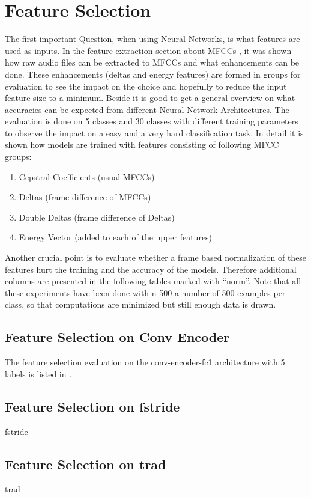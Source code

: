 
\section{Feature Selection}\label{sec:exp_fs}
The first important Question, when using Neural Networks, is what features are used as inputs.
In the feature extraction section about MFCCs , it was shown how raw audio files can be extracted to MFCCs and what enhancements can be done.
These enhancements (deltas and energy features) are formed in groups for evaluation to see the impact on the choice and hopefully to reduce the input feature size to a minimum.
Beside it is good to get a general overview on what accuracies can be expected from different Neural Network Architectures.
The evaluation is done on 5 classes and 30 classes with different training parameters to observe the impact on a easy and a very hard classification task.
In detail it is shown how models are trained with features consisting of following MFCC groups:
\begin{enumerate}
    \item Cepstral Coefficients (usual MFCCs)
    \item Deltas (frame difference of MFCCs)
    \item Double Deltas (frame difference of Deltas)
    \item Energy Vector (added to each of the upper features)
\end{enumerate}
Another crucial point is to evaluate whether a frame based normalization of these features hurt the training and the accuracy of the models.
Therefore additional columns are presented in the following tables marked with \enquote{norm}.
Note that all these experiments have been done with n-500 a number of 500 examples per class, so that computations are minimized but still enough data is drawn.

\subsection{Feature Selection on Conv Encoder}
The feature selection evaluation on the conv-encoder-fc1 architecture with 5 labels is listed in .
% 
% 
% 




\subsection{Feature Selection on fstride}
fstride


\subsection{Feature Selection on trad}
trad


